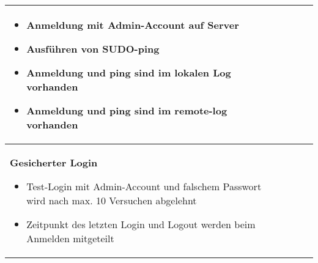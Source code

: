 \begin{longtable}{p{6.8cm}p{2.4cm}p{2.4cm}p{3cm}}
\begin{itemize}
\item
  Anmeldung mit Admin-Account auf Server
\item
  Ausführen von SUDO-ping
\item
  Anmeldung und ping sind im lokalen Log vorhanden
\item
  Anmeldung und ping sind im remote-log vorhanden
\end{itemize} & & & \\
\midrule
\textbf{Gesicherter Login}

\begin{itemize}
\item
  Test-Login mit Admin-Account und falschem Passwort wird nach max. 10
  Versuchen abgelehnt
\item
  Zeitpunkt des letzten Login und Logout werden beim Anmelden mitgeteilt
\end{itemize} & & & \\

\bottomrule
\end{longtable}